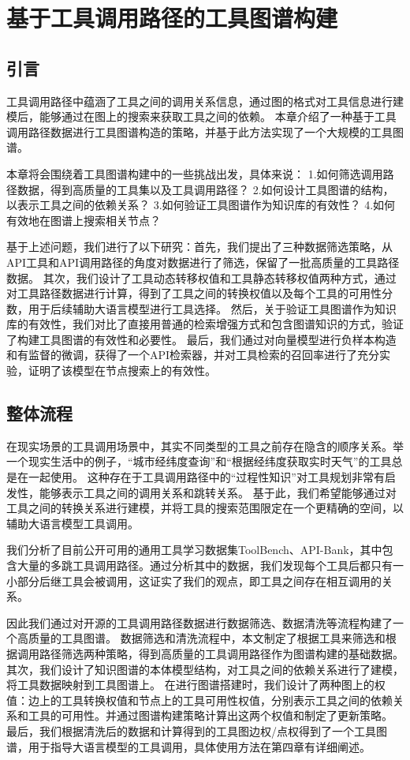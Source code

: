 \chapter{基于工具调用路径的工具图谱构建}

\section{引言}

工具调用路径中蕴涵了工具之间的调用关系信息，通过图的格式对工具信息进行建模后，能够通过在图上的搜索来获取工具之间的依赖。
本章介绍了一种基于工具调用路径数据进行工具图谱构造的策略，并基于此方法实现了一个大规模的工具图谱。

本章将会围绕着工具图谱构建中的一些挑战出发，具体来说：
1.如何筛选调用路径数据，得到高质量的工具集以及工具调用路径？
2.如何设计工具图谱的结构，以表示工具之间的依赖关系？
3.如何验证工具图谱作为知识库的有效性？
4.如何有效地在图谱上搜索相关节点？

基于上述问题，我们进行了以下研究：首先，我们提出了三种数据筛选策略，从API工具和API调用路径的角度对数据进行了筛选，保留了一批高质量的工具路径数据。
其次，我们设计了工具动态转移权值和工具静态转移权值两种方式，通过对工具路径数据进行计算，得到了工具之间的转换权值以及每个工具的可用性分数，用于后续辅助大语言模型进行工具选择。
然后，关于验证工具图谱作为知识库的有效性，我们对比了直接用普通的检索增强方式和包含图谱知识的方式，验证了构建工具图谱的有效性和必要性。
最后，我们通过对向量模型进行负样本构造和有监督的微调，获得了一个API检索器，并对工具检索的召回率进行了充分实验，证明了该模型在节点搜索上的有效性。

\section{整体流程}

在现实场景的工具调用场景中，其实不同类型的工具之前存在隐含的顺序关系。举一个现实生活中的例子，“城市经纬度查询”和“根据经纬度获取实时天气”的工具总是在一起使用。
这种存在于工具调用路径中的“过程性知识”对工具规划非常有启发性，能够表示工具之间的调用关系和跳转关系。
基于此，我们希望能够通过对工具之间的转换关系进行建模，并将工具的搜索范围限定在一个更精确的空间，以辅助大语言模型工具调用。

我们分析了目前公开可用的通用工具学习数据集ToolBench、API-Bank，其中包含大量的多跳工具调用路径。通过分析其中的数据，我们发现每个工具后都只有一小部分后继工具会被调用，这证实了我们的观点，即工具之间存在相互调用的关系。

因此我们通过对开源的工具调用路径数据进行数据筛选、数据清洗等流程构建了一个高质量的工具图谱。
数据筛选和清洗流程中，本文制定了根据工具来筛选和根据调用路径筛选两种策略，得到高质量的工具调用路径作为图谱构建的基础数据。
其次，我们设计了知识图谱的本体模型结构，对工具之间的依赖关系进行了建模，将工具数据映射到工具图谱上。
在进行图谱搭建时，我们设计了两种图上的权值：边上的工具转换权值和节点上的工具可用性权值，分别表示工具之间的依赖关系和工具的可用性。并通过图谱构建策略计算出这两个权值和制定了更新策略。
最后，我们根据清洗后的数据和计算得到的工具图边权/点权得到了一个工具图谱，用于指导大语言模型的工具调用，具体使用方法在第四章有详细阐述。


